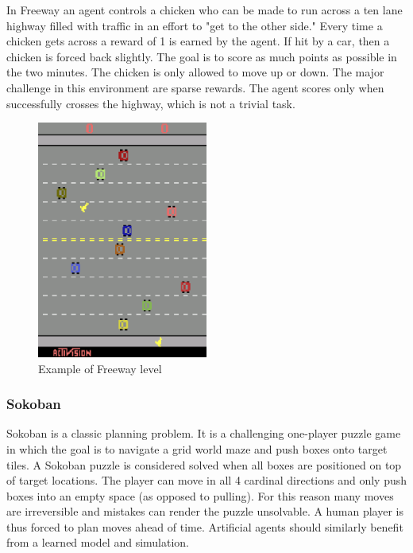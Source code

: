 In Freeway an agent controls a chicken who can be made to run across a ten lane highway filled with traffic in an effort to "get to the other side." Every time a chicken gets across a reward of 1 is earned by the agent. If hit by a car, then a chicken is forced back slightly. The goal is to score as much points as possible in the two minutes. The chicken is only allowed to move up or down. 
The major challenge in this environment are sparse rewards. The agent scores only when successfully crosses the highway, which is not a trivial task.

\begin{figure}[H]
\includegraphics[width=0.5\textwidth,keepaspectratio]{figures/Freeway.png}
\caption[Freeway]{Example of Freeway level}
\label{Fig.Freeway}
\end{figure}


\subsubsection{Sokoban}


Sokoban is a classic planning problem. It is a challenging one-player puzzle game in which the goal is to navigate a grid world maze and push boxes onto target tiles. A Sokoban puzzle is considered solved when all boxes are positioned on top of target locations. The player can move in all 4 cardinal directions and only push boxes into an empty space (as opposed to pulling). For this reason many moves are irreversible and mistakes can render the puzzle unsolvable. A human player is thus forced to plan moves ahead of time. Artificial agents should similarly benefit from a learned model and simulation.

